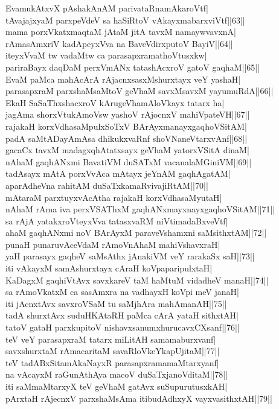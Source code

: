 \documentclass{article}
\begin{document}
EvamukAtxvX pAshakAnAM parivataRnamAkaroVtf|\\
tAvajajxyaM parxpeVdeV sa haSiRtoV vAkayxmabarxviVtf||63||\\
mama porxVkatxmaqtaM jAtaM jitA tavxM namaywvavxnA|\\
rAmasAmxriV kadApeyxVva na BaveVdirxputoV BayiV||64||\\
iteyxVvaM tw vadaMtw ca parasapxramathoVtusxkw|\\
pariraBayx daqDaM perxVmANx tatashAcxroV gatoV gaqhaM||65||\\
EvaM paMca mahAcArA rAjacnxsasxMshurxtayx veY yashaH|\\
parasapxraM parxshaMsaMtoV geVhaM savxMsavxM yayumuRdA||66||\\
EkaH SaSaThxshacxroV kArugeVhamAloVkayx tatarx ha|\\
jagAma shorxVtukAmoVsw yashoV rAjocnxV mahiVpateVH||67||\\
rajakaH korxVdhasaMpulxSoTxV BArAyxmanayxgaqhoVSitAM|\\
padA saMtADayAmAsa dhikukxvaRnf shoVNaneVtarxvAnf||68||\\
gacaCx tavxM madagxqhAtatxsayx geVhaM yatorxVSitA dinaM|\\
nAhaM gaqhANxmi BavatiVM duSATxM vacanalaMGiniVM||69||\\
tadAsayx mAtA porxVvAca mAtayx jeYnAM gaqhAgatAM|\\
aparAdheVna rahitAM duSaTxkamaRvivajiRtAM||70||\\
mAtaraM parxtuyxvAcAtha rajakaH korxVdhasaMyutaH|\\
nAhaM rAma iva perxVSAThxM gaqhANxmayxnayxgaqhoVSitAM||71||\\
sa rAjA yatakxroVteyxVva tatasxvaRM niVtimadaBxveVtf|\\
ahaM gaqhANxmi noV BArAyxM paraveVshamxni saMsithxtAM||72||\\
punaH punaruvAceVdaM rAmoVnAhaM mahiVshavxraH|\\
yaH parasayx gaqheV saMsAthx jAnakiVM veY rarakaSx saH||73||\\
iti vAkayxM samAshurxtayx cAraH koVpaparipulxtaH|\\
KaDagxM gaqhiVtAvx savxkareV taM haMtuM vidadheV manaH||74||\\
sa rAmoVkatxM ca sasAmxra na vadhayxH koVpi meV janaH|\\
iti jAcnxtAvx savxroVSaM tu saMj{hA}ra mahAmanAH||75||\\
tadA shurxtAvx suduHKAtaRH paMca cArA yataH sithxtAH|\\
tatoV gataH parxkupitoV nishavxsanumxhurucavxCXsanf||76||\\
teV veY parasapxraM tatarx miLitAH samamaburxvanf|\\
savxshurxtaM rAmacaritaM savaRloVkeYkapUjitaM||77||\\
teV tadABxSitamAkaNayxR parasapxramamaMtarxyanf|\\
na vAcayxM raGunAthAya macoV duSaTxjanoVditaM||78||\\
iti saMmaMtarxyX teV geVhaM gatAvx suSupurutusxkAH|\\
pArxtaH rAjecnxV parxshaMsAma itibudAdhxyX vayxvasithxtAH||79||\\
\end{document}
